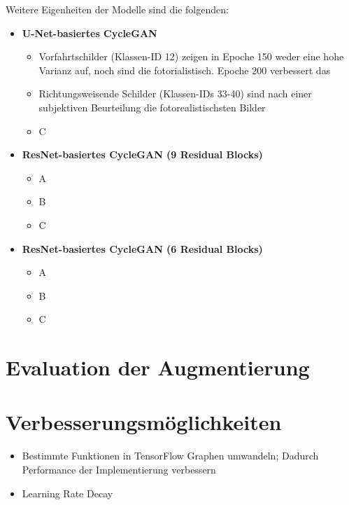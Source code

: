 Weitere Eigenheiten der Modelle sind die folgenden:
\begin{itemize}
	\item \textbf{U-Net-basiertes \ac{CycleGAN}}
		\begin{itemize}
			\item Vorfahrtschilder (Klassen-ID 12) zeigen in Epoche 150 weder eine hohe Varianz auf, noch sind die fotorialistisch. Epoche 200 verbessert das 
			\item Richtungsweisende Schilder (Klassen-IDs 33-40) sind nach einer subjektiven Beurteilung die fotorealistischsten Bilder
			\item C
		\end{itemize}
	\item \textbf{ResNet-basiertes \ac{CycleGAN} (9 Residual Blocks)}
		\begin{itemize}
			\item A
			\item B
			\item C
		\end{itemize}
	\item \textbf{ResNet-basiertes \ac{CycleGAN} (6 Residual Blocks)}
		\begin{itemize}
			\item A
			\item B
			\item C
		\end{itemize}
\end{itemize}

\section{Evaluation der Augmentierung}

\section{Verbesserungsmöglichkeiten}
\begin{itemize}
   \item Bestimmte Funktionen in TensorFlow Graphen umwandeln; Dadurch Performance der Implementierung verbessern
   \item Learning Rate Decay
\end{itemize}
